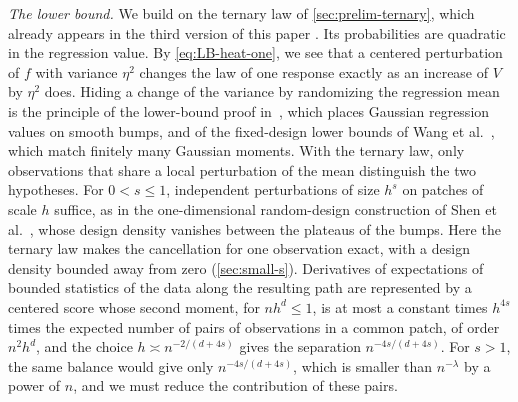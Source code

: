 \emph{The lower bound.} We build on the ternary law of
\cref{sec:prelim-ternary}, which already appears in the third version
of this paper \cite{AronowLopatto2026v3}. Its probabilities are
quadratic in the regression value. By \eqref{eq:LB-heat-one}, we see
that a centered perturbation of $f$ with variance $\eta^2$ changes the
law of one response exactly as an increase of $V$ by $\eta^2$ does. Hiding a
change of the variance by randomizing the regression mean is the
principle of the lower-bound proof in~\cite[Section~4.5]{Spokoiny2002},
which places Gaussian regression values on smooth bumps, and of the
fixed-design lower bounds of Wang et al.\
\cite[Section~6.2]{WangBrownCaiLevine2008}, which match finitely many
Gaussian moments. With the ternary law, only observations that share a
local perturbation of the mean distinguish the two hypotheses. For
$0<s\le1$, independent perturbations of size $h^s$ on patches of scale
$h$ suffice, as in the one-dimensional random-design construction of Shen et al.\
\cite[Sections~2.2 and~5]{ShenGaoWittenHan2020}, whose design density
vanishes between the plateaus of the bumps. Here the ternary law makes the
cancellation for one observation exact, with a design density bounded
away from zero (\cref{sec:small-s}). Derivatives of expectations of bounded statistics of the data along
the resulting path are represented by a centered score whose second
moment, for $nh^d\le1$, is at most a constant times $h^{4s}$ times the
expected number of pairs of observations in a common patch, of order
$n^2h^d$, and the choice $h\asymp n^{-2/(d+4s)}$ gives the separation
$n^{-4s/(d+4s)}$. For $s>1$, the same balance would give
only $n^{-4s/(d+4s)}$, which is smaller than $n^{-\lambda}$ by a power
of $n$, and we must reduce the contribution of these pairs.

